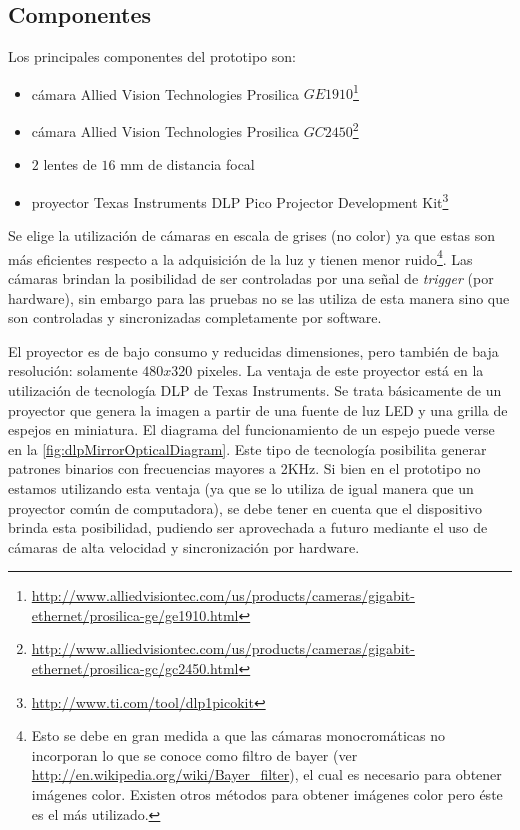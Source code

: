 \subsection{Componentes}
Los principales componentes del prototipo son:

\begin{itemize}
    \item cámara Allied Vision Technologies Prosilica $GE1910$\footnote{\url{http://www.alliedvisiontec.com/us/products/cameras/gigabit-ethernet/prosilica-ge/ge1910.html}}
    \item cámara Allied Vision Technologies Prosilica $GC2450$\footnote{\url{http://www.alliedvisiontec.com/us/products/cameras/gigabit-ethernet/prosilica-gc/gc2450.html}}
    \item $2$ lentes de $16$ mm de distancia focal
    \item proyector Texas Instruments DLP Pico Projector Development Kit\footnote{\url{http://www.ti.com/tool/dlp1picokit}}
\end{itemize}

Se elige la utilización de cámaras en escala de grises (no color) ya que estas son más eficientes respecto a la adquisición de la luz y tienen menor ruido\footnote{Esto se debe en gran medida a que las cámaras monocromáticas no incorporan lo que se conoce como filtro de bayer (ver \url{http://en.wikipedia.org/wiki/Bayer_filter}), el cual es necesario para obtener imágenes color. Existen otros métodos para obtener imágenes color pero éste es el más utilizado.}. Las cámaras brindan la posibilidad de ser controladas por una señal de \emph{trigger} (por hardware), sin embargo para las pruebas no se las utiliza de esta manera sino que son controladas y sincronizadas completamente por software.

El proyector es de bajo consumo y reducidas dimensiones, pero también de baja resolución: solamente $480x320$ pixeles. La ventaja de este proyector está en la utilización de tecnología DLP de Texas Instruments. Se trata básicamente de un proyector que genera la imagen a partir de una fuente de luz LED y una grilla de espejos en miniatura. El diagrama del funcionamiento de un espejo puede verse en la \autoref{fig:dlpMirrorOpticalDiagram}. Este tipo de tecnología posibilita generar patrones binarios con frecuencias mayores a 2KHz. Si bien en el prototipo no estamos utilizando esta ventaja (ya que se lo utiliza de igual manera que un proyector común de computadora), se debe tener en cuenta que el dispositivo brinda esta posibilidad, pudiendo ser aprovechada a futuro mediante el uso de cámaras de alta velocidad y sincronización por hardware.

